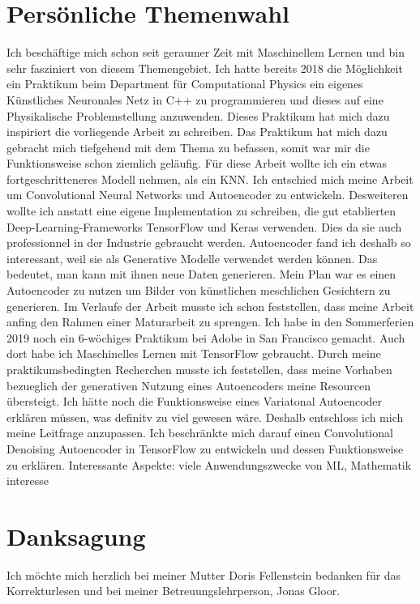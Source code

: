 \section*{Persönliche Themenwahl}
Ich beschäftige mich schon seit geraumer Zeit mit Maschinellem Lernen und bin
sehr fasziniert von diesem Themengebiet. Ich hatte bereits 2018 die Möglichkeit
ein Praktikum beim Department für Computational Physics ein eigenes Künstliches
Neuronales Netz in C++ zu programmieren und dieses auf eine Physikalische
Problemstellung anzuwenden. Dieses Praktikum hat mich dazu inspiriert die
vorliegende Arbeit zu schreiben. Das Praktikum hat mich dazu gebracht mich
tiefgehend mit dem Thema zu befassen, somit war mir die Funktionsweise schon
ziemlich geläufig.
\para{}
Für diese Arbeit wollte ich ein etwas fortgeschritteneres Modell nehmen, als ein
KNN. Ich entschied mich meine Arbeit um Convolutional Neural Networks und
Autoencoder zu entwickeln. Desweiteren wollte ich anstatt eine eigene
Implementation zu schreiben, die gut etablierten Deep-Learning-Frameworks
TensorFlow und Keras verwenden. Dies da sie auch professionnel in der Industrie
gebraucht werden.
\para{}
Autoencoder fand ich deshalb so interessant, weil sie
als Generative Modelle verwendet werden können. Das bedeutet, man kann mit ihnen
neue Daten generieren. Mein Plan war es einen Autoencoder zu nutzen um Bilder
von künstlichen meschlichen Gesichtern zu generieren.
\para{}
Im Verlaufe der Arbeit musste ich schon feststellen, dass meine Arbeit
anfing den Rahmen einer Maturarbeit zu sprengen. Ich habe in den Sommerferien
2019 noch ein 6-wöchiges Praktikum bei Adobe in San Francisco gemacht. Auch dort
habe ich Maschinelles Lernen mit TensorFlow gebraucht. Durch meine
praktikumsbedingten Recherchen musste ich feststellen, dass meine Vorhaben
bezueglich der generativen Nutzung eines Autoencoders meine Resourcen
übersteigt. Ich hätte noch die Funktionsweise eines Variatonal Autoencoder
erklären müssen, was definitv zu viel gewesen wäre.
\para{}
Deshalb entschloss ich mich meine Leitfrage anzupassen. Ich beschränkte mich
darauf einen Convolutional Denoising Autoencoder in TensorFlow zu entwickeln und
dessen Funktionsweise zu erklären.
\para{}
Interessante Aspekte: viele Anwendungszwecke von ML, Mathematik interesse

\section*{Danksagung}
Ich möchte mich herzlich bei meiner Mutter Doris Fellenstein bedanken für das
Korrekturlesen und bei meiner Betreuungslehrperson, Jonas Gloor.


